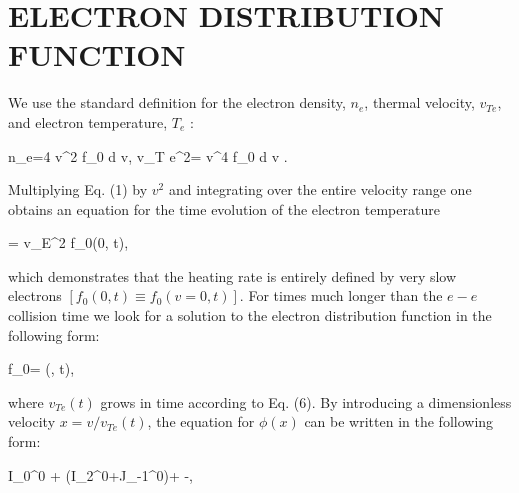 \documentclass[oneside,onecolumn]{article}
\begin{document}
\begin{sloppypar}
 \section{ELECTRON DISTRIBUTION FUNCTION}
 We use the standard definition for the electron density, $n_{e}$, thermal velocity, $v_{T e}$, and electron temperature, $T_{e}$ :
 
 n_{e}=4 \pi \int v^{2} f_{0} d v, \quad v_{T e}^{2}= \int v^{4} f_{0} d v \equiv {} .
 
 Multiplying Eq. (1) by $v^{2}$ and integrating over the entire velocity range one obtains an equation for the time evolution of the electron temperature
 
 = v_{E}^{2} f_{0}(0, t),
 
 which demonstrates that the heating rate is entirely defined by very slow electrons $\left[f_{0}(0, t) \equiv f_{0}(v=0, t)\right]$. For times much longer than the $e-e$ collision time we look for a solution to the electron distribution function in the following form:
 
 f_{0}= \phi\left(, t\right),
 
 where $v_{T e}(t)$ grows in time according to Eq. (6). By introducing a dimensionless velocity $x=v / v_{T e}(t)$, the equation for $\phi(x)$ can be written in the following form:
 
 \phi I_{0}^{0}  + \left(I_{2}^{0}+J_{-1}^{0}\right)+%
 -,
 

\end{sloppypar}
\end{document}
